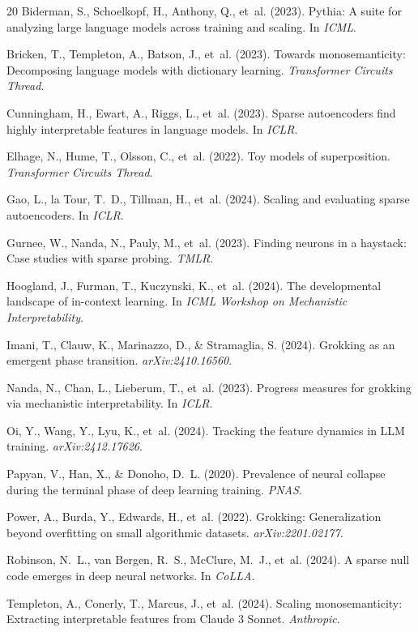 \documentclass{article}
\begin{document}
\begin{thebibliography}{20}
Biderman, S., Schoelkopf, H., Anthony, Q., et~al. (2023).
Pythia: A suite for analyzing large language models across training and scaling.
In \textit{ICML}.

Bricken, T., Templeton, A., Batson, J., et~al. (2023).
Towards monosemanticity: Decomposing language models with dictionary learning.
\textit{Transformer Circuits Thread}.

Cunningham, H., Ewart, A., Riggs, L., et~al. (2023).
Sparse autoencoders find highly interpretable features in language models.
In \textit{ICLR}.

Elhage, N., Hume, T., Olsson, C., et~al. (2022).
Toy models of superposition.
\textit{Transformer Circuits Thread}.

Gao, L., la Tour, T.~D., Tillman, H., et~al. (2024).
Scaling and evaluating sparse autoencoders.
In \textit{ICLR}.

Gurnee, W., Nanda, N., Pauly, M., et~al. (2023).
Finding neurons in a haystack: Case studies with sparse probing.
\textit{TMLR}.

Hoogland, J., Furman, T., Kuczynski, K., et~al. (2024).
The developmental landscape of in-context learning.
In \textit{ICML Workshop on Mechanistic Interpretability}.

Imani, T., Clauw, K., Marinazzo, D., \& Stramaglia, S. (2024).
Grokking as an emergent phase transition.
\textit{arXiv:2410.16560}.

Nanda, N., Chan, L., Lieberum, T., et~al. (2023).
Progress measures for grokking via mechanistic interpretability.
In \textit{ICLR}.

Oi, Y., Wang, Y., Lyu, K., et~al. (2024).
Tracking the feature dynamics in LLM training.
\textit{arXiv:2412.17626}.

Papyan, V., Han, X., \& Donoho, D.~L. (2020).
Prevalence of neural collapse during the terminal phase of deep learning training.
\textit{PNAS}.

Power, A., Burda, Y., Edwards, H., et~al. (2022).
Grokking: Generalization beyond overfitting on small algorithmic datasets.
\textit{arXiv:2201.02177}.

Robinson, N.~L., van Bergen, R.~S., McClure, M.~J., et~al. (2024).
A sparse null code emerges in deep neural networks.
In \textit{CoLLA}.

Templeton, A., Conerly, T., Marcus, J., et~al. (2024).
Scaling monosemanticity: Extracting interpretable features from Claude 3 Sonnet.
\textit{Anthropic}.
\end{thebibliography}
\end{document}
